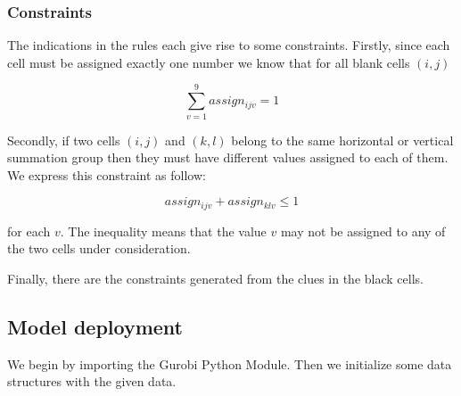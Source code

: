 \documentclass[11pt]{article}
\begin{document}
\subsubsection{Constraints}\label{constraints}

The indications in the rules each give rise to some constraints.
Firstly, since each cell must be assigned exactly one number we know
that for all blank cells \((i,j)\)

\[\sum_{v=1}^{9} assign_{ijv} = 1\]

Secondly, if two cells \((i,j)\) and \((k,l)\) belong to the same
horizontal or vertical summation group then they must have different
values assigned to each of them. We express this constraint as follow:

\[assign_{ijv} + assign_{klv} \leq 1\]

for each \(v\). The inequality means that the value \(v\) may not be
assigned to any of the two cells under consideration.

Finally, there are the constraints generated from the clues in the black
cells.

\subsection{Model deployment}\label{model-deployment}

We begin by importing the Gurobi Python Module. Then we initialize some
data structures with the given data.
\end{document}
